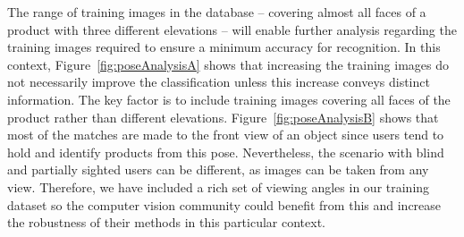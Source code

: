 

The range of training images in the database -- covering almost all faces of a product with three different elevations -- will enable further analysis regarding the training images required to ensure a minimum accuracy for recognition.  In this context, Figure~\ref{fig:poseAnalysisA} shows that increasing the training images do not necessarily improve the classification unless this increase conveys distinct information. The key factor is to include training images covering all faces of the product rather than different elevations. Figure~\ref{fig:poseAnalysisB} shows that most of the matches are made to the front view of an object since users tend to hold and identify products from this pose. Nevertheless, the scenario with blind and partially sighted users can be different, as images can be taken from any view.  Therefore, we have included a rich set of viewing angles in our training dataset so the computer vision community could benefit from this and increase the robustness of their methods in this particular context.



